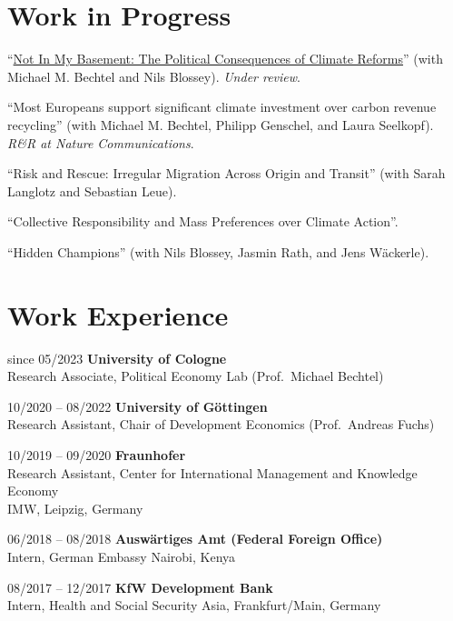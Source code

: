 \documentclass[a4paper,11pt]{article}
\newcommand{\cventry}[3]{%
  #2 \hfill \textbf{#1} \\
  #3\par\vspace{6pt}%
}
\begin{document}
\section{Work in Progress}

``{\href{https://www.econtribute.de/RePEc/ajk/ajkdps/ECONtribute_427_2026.pdf}{Not In My Basement: The Political Consequences of Climate Reforms}}'' (with Michael M. Bechtel and Nils Blossey). \textit{Under review}.

\vspace{6pt}

``Most Europeans support significant climate investment over carbon revenue recycling''
(with Michael M. Bechtel, Philipp Genschel, and Laura Seelkopf). \textit{R\&R at Nature Communications}.

\vspace{6pt}

``Risk and Rescue: Irregular Migration Across Origin and Transit'' (with Sarah Langlotz and Sebastian Leue).

\vspace{6pt}

``Collective Responsibility and Mass Preferences over Climate Action''.

\vspace{6pt}

``Hidden Champions'' (with Nils Blossey, Jasmin Rath, and Jens W\"ackerle).

\section{Work Experience}

\cventry{University of Cologne}{since 05/2023}{%
  Research Associate, Political Economy Lab (Prof.\ Michael Bechtel)%
}

\cventry{University of G\"ottingen}{10/2020 -- 08/2022}{%
  Research Assistant, Chair of Development Economics (Prof.\ Andreas Fuchs)%
}

\cventry{Fraunhofer}{10/2019 -- 09/2020}{%
  Research Assistant, Center for International Management and Knowledge Economy\\
  IMW, Leipzig, Germany%
}

\cventry{Ausw\"artiges Amt (Federal Foreign Office)}{06/2018 -- 08/2018}{%
  Intern, German Embassy Nairobi, Kenya%
}

\cventry{KfW Development Bank}{08/2017 -- 12/2017}{%
  Intern, Health and Social Security Asia, Frankfurt/Main, Germany%
}
\end{document}
